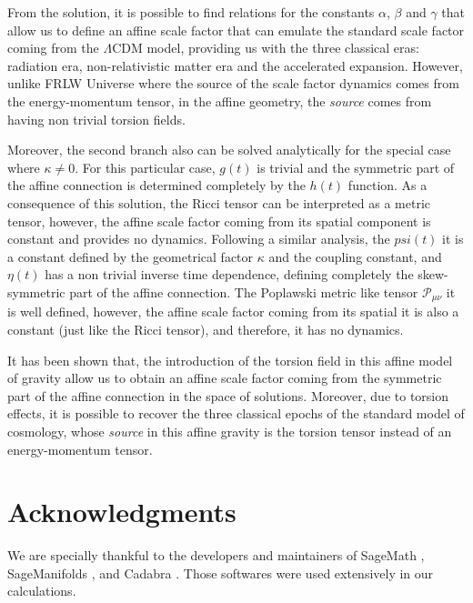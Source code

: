 From the solution, it is possible to find relations for the constants $\alpha$, $\beta$ and $\gamma$
that allow us to define an affine scale factor that can emulate the standard scale factor coming
from the $\Lambda$CDM model, providing us with the three classical eras: radiation era, non-relativistic
matter era and the accelerated expansion. However, unlike FRLW Universe where the source of the scale
factor dynamics comes from the energy-momentum tensor, in the affine geometry, the \textit{source}
comes from  having non trivial torsion fields.

Moreover, the second branch also can be solved analytically for the special case where $\kappa \neq 0$. 
For this particular case, $g(t)$ is trivial and the symmetric part of the affine connection is
determined completely by the $h(t)$ function. As a consequence of this solution, the Ricci tensor
can be interpreted as a metric tensor, however, the affine scale factor coming from its spatial 
component is constant and provides no dynamics. Following a similar analysis, the $psi(t)$ it is
a constant defined by the geometrical factor $\kappa$ and the coupling constant, and
$\eta(t)$ has a non trivial inverse time dependence, defining completely the skew-symmetric part
of the affine connection. The Poplawski metric like tensor $\mathcal{P}_{\mu\nu}$ it is well defined,
however, the affine scale factor coming from its spatial it is also a constant (just like the Ricci
tensor), and therefore, it has no dynamics.


It has been shown that, the introduction of the torsion field in this affine model of gravity
allow us to obtain an affine scale factor coming from the symmetric part of the affine connection
in the space of solutions. Moreover, due to torsion effects, it is possible to recover the 
three classical epochs of the standard model of cosmology, whose \textit{source} in this affine gravity 
is the torsion tensor instead of an energy-momentum tensor.


\section{Acknowledgments}

We are specially thankful to the developers and maintainers of SageMath \cite{sagemath}, SageManifolds 
\cite{Gourgoulhon_2015,Gourgoulhon_2018}, and Cadabra \cite{peeters2018introducing,Peeters2018,Peeters_2007}. Those softwares were 
used extensively in our calculations.









